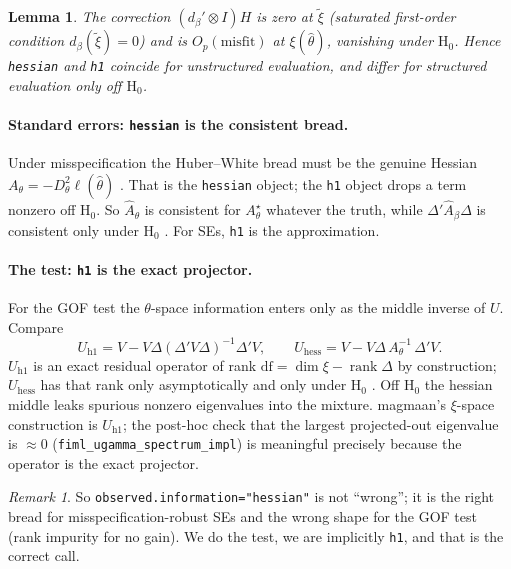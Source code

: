\documentclass[11pt]{article}
\newcommand{\rank}{\operatorname{rank}}
\theoremstyle{plain}
\newtheorem{lemma}{Lemma}
\theoremstyle{remark}
\newtheorem*{remark}{Remark}
\begin{document}
\begin{lemma}\label{lem:vanish}
The correction \((d_\beta'\otimes I)H\) is zero at \(\tilde\xi\) (saturated
first-order condition \(d_\beta(\tilde\xi)=0\)) and is \(O_p(\text{misfit})\) at
\(\xi(\hat\theta)\), vanishing under \(\mathrm{H}_0\). Hence \texttt{hessian}
and \texttt{h1} coincide for unstructured evaluation, and differ for structured
evaluation only off \(\mathrm{H}_0\).
\end{lemma}

\paragraph{Standard errors: \texttt{hessian} is the consistent bread.} Under
misspecification the Huber--White bread must be the genuine Hessian
\(A_\theta=-D^2_\theta\ell(\hat\theta)\) \cite{white1982}. That is the
\texttt{hessian} object; the \texttt{h1} object drops a term nonzero off
\(\mathrm{H}_0\). So \(\hat A_\theta\) is consistent for \(A_\theta^\star\)
whatever the truth, while \(\Delta'\hat A_\beta\Delta\) is consistent only under
\(\mathrm{H}_0\) \cite{savaleirosseel2022}. For SEs, \texttt{h1} is the
approximation.

\paragraph{The test: \texttt{h1} is the exact projector.} For the GOF test the
\(\theta\)-space information enters only as the middle inverse of \(U\). Compare
\[
  U_{\mathrm{h1}} = V - V\Delta(\Delta'V\Delta)^{-1}\Delta'V,
  \qquad
  U_{\mathrm{hess}} = V - V\Delta\,A_\theta^{-1}\,\Delta'V .
\]
\(U_{\mathrm{h1}}\) is an exact residual operator of rank \(\mathrm{df}=
\dim\xi-\rank\Delta\) by construction; \(U_{\mathrm{hess}}\) has that rank only
asymptotically and only under \(\mathrm{H}_0\) \cite[Table~6]{savaleirosseel2022}.
Off \(\mathrm{H}_0\) the hessian middle leaks spurious nonzero eigenvalues into
the mixture. magmaan's \(\xi\)-space construction is \(U_{\mathrm{h1}}\); the
post-hoc check that the largest projected-out eigenvalue is \(\approx 0\)
(\verb|fiml_ugamma_spectrum_impl|) is meaningful precisely because the operator
is the exact projector.

\begin{remark}
So \texttt{observed.information="hessian"} is not ``wrong''; it is the right
bread for misspecification-robust SEs and the wrong shape for the GOF test
(rank impurity for no gain). We do the test, we are implicitly \texttt{h1}, and
that is the correct call.
\end{remark}
\end{document}
